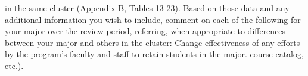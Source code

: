 \documentclass[12pt]{article}
\begin{document}
in the same cluster (Appendix B, Tables 13-23). Based on those data and any additional 
information you wish to include, comment on each of the following for your major over the 
review period, referring, when appropriate to differences between your major and others in the 
cluster:
Change 
effectiveness of any efforts by the program’s faculty and staff to retain students in the 
major.
course catalog, etc.).
\end{document}
